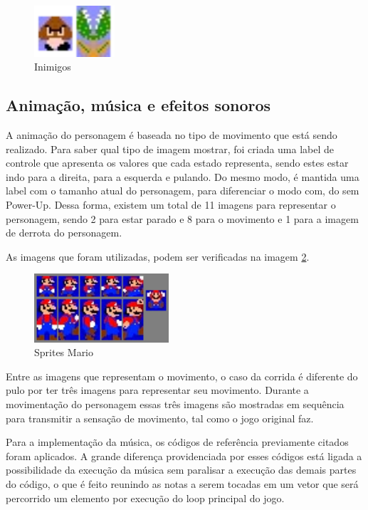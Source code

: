 \documentclass[11pt, twocolumn]{extarticle}
\begin{document}
\begin{figure}[H]
	\centering
	\includegraphics[width=3cm]{figuras/Inimigos.png}
	\caption{Inimigos}
	\label{image: Inimigos}
\end{figure}


\subsection{Animação, música e efeitos sonoros}
\indent \indent A animação do personagem é baseada no tipo de movimento que está sendo realizado. Para saber qual tipo de imagem mostrar, foi criada uma label de controle que apresenta os valores que cada estado representa, sendo estes estar indo para a direita, para a esquerda e pulando. Do mesmo modo, é mantida uma label com o tamanho atual do personagem, para diferenciar o modo com, do sem Power-Up. Dessa forma, existem um total de 11 imagens para representar o personagem, sendo 2 para estar parado e 8 para o movimento e 1 para a imagem de derrota do personagem.

As imagens que foram utilizadas, podem ser verificadas na imagem \ref{image: Sprites Mario}.

\begin{figure}[H]
	\centering
	\includegraphics[width=5cm]{figuras/SpritesMario.png}
	\caption{Sprites Mario}
	\label{image: Sprites Mario}
\end{figure}

Entre as imagens que representam o movimento, o caso da corrida é diferente do pulo por ter três imagens para representar seu movimento. Durante a movimentação do personagem essas três imagens são mostradas em sequência para transmitir a sensação de movimento, tal como o jogo original faz. 

Para a implementação da música, os códigos de referência previamente citados foram aplicados. A grande diferença providenciada por esses códigos está ligada a possibilidade da execução da música sem paralisar a execução das demais partes do código, o que é feito reunindo as notas a serem tocadas em um vetor que será percorrido um elemento por execução do loop principal do jogo.
\end{document}
